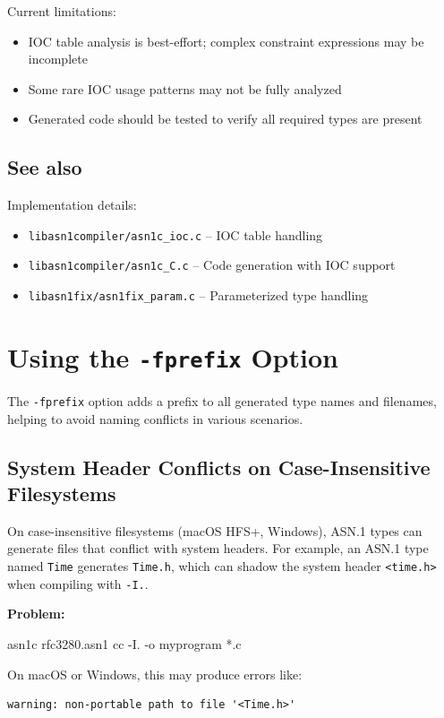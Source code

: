 \documentclass[english,oneside,12pt]{book}
\begin{document}
Current limitations:
\begin{itemize}
\item IOC table analysis is best-effort; complex constraint expressions may be incomplete
\item Some rare IOC usage patterns may not be fully analyzed
\item Generated code should be tested to verify all required types are present
\end{itemize}

\subsection*{See also}

Implementation details:
\begin{itemize}
\item \texttt{libasn1compiler/asn1c\_ioc.c} -- IOC table handling
\item \texttt{libasn1compiler/asn1c\_C.c} -- Code generation with IOC support
\item \texttt{libasn1fix/asn1fix\_param.c} -- Parameterized type handling
\end{itemize}

\section{\label{sec:Using-fprefix}Using the \texttt{-fprefix} Option}

The \texttt{-fprefix} option adds a prefix to all generated type names and filenames, 
helping to avoid naming conflicts in various scenarios.

\subsection*{System Header Conflicts on Case-Insensitive Filesystems}

On case-insensitive filesystems (macOS HFS+, Windows), ASN.1 types can generate 
files that conflict with system headers. For example, an ASN.1 type named \texttt{Time} 
generates \texttt{Time.h}, which can shadow the system header \texttt{<time.h>} when 
compiling with \texttt{-I.}.

\textbf{Problem:}
\begin{bash}
asn1c rfc3280.asn1
cc -I. -o myprogram *.c
\end{bash}

On macOS or Windows, this may produce errors like:
\begin{verbatim}
warning: non-portable path to file '<Time.h>'
\end{verbatim}
\end{document}
